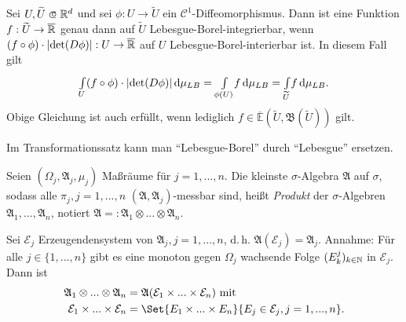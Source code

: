 \documentclass{cheat-sheet}
\newcommand{\Alg}{\mathfrak{A}} %
\newcommand{\Bor}{\mathfrak{B}} %
\newcommand{\E}{\mathbb{E}} %
\theoremstyle{definition}
\begin{document}

\begin{satz}[Transformationssatz]
  Sei $U, \widetilde{U} \opn \R^d$ und sei $\phi : U \to \widetilde{U}$ ein $\mathcal{C}^1$-Diffeomorphismus. Dann ist eine Funktion $f : \widetilde{U} \to \overline{\mathbb{R}}$ genau dann auf $\widetilde{U}$ Lebesgue-Borel-integrierbar, wenn $(f \circ \phi) \cdot \lvert\det(D\phi)\rvert : U \to \overline{\mathbb{R}}$ auf $U$ Lebesgue-Borel-interierbar ist. In diesem Fall gilt
  \[ {\textstyle \int\limits_{U}^{}} (f \circ \phi) \cdot \lvert\det(D\phi)\rvert \,\mathrm{d} \mu_{LB} = {\textstyle \int\limits_{\phi(U)}^{}} f \,\mathrm{d} \mu_{LB} = {\textstyle \int\limits_{\widetilde{U}}^{}} f \,\mathrm{d} \mu_{LB}. \]
  Obige Gleichung ist auch erfüllt, wenn lediglich $f \in \overline{\E}(\widetilde{U}, \Bor(\widetilde{U}))$ gilt.
\end{satz}

\begin{bem}
  Im Transformationssatz kann man "`Lebesgue-Borel"' durch "`Lebesgue"' ersetzen.
\end{bem}


% 

\begin{defn}
  Seien $(\Omega_j, \Alg_j, \mu_j)$ Maßräume für $j = 1, ..., n$. Die kleinste $\sigma$-Algebra $\Alg$ auf $\sigma$, sodass alle $\pi_j, j = 1, ..., n$ $(\Alg, \Alg_j)$-messbar sind, heißt \emph{Produkt} der $\sigma$-Algebren $\Alg_1, ..., \Alg_n$, notiert $\Alg =: \Alg_1 \otimes ... \otimes \Alg_n$.
\end{defn}

\begin{satz}
  Sei $\mathcal{E}_j$ Erzeugendensystem von $\Alg_j, j = 1, ..., n$, d.\,h. $\Alg(\mathcal{E}_j) = \Alg_j$. Annahme: Für alle $j \in \{ 1, ..., n \}$ gibt es eine monoton gegen $\Omega_j$ wachsende Folge $(E^j_k)_{k \in \mathbb{N}}$ in $\mathcal{E}_j$. Dann ist
  \begin{align*}
    \Alg_1 \otimes ... \otimes \Alg_n &= \Alg(\mathcal{E}_1 \times ... \times \mathcal{E}_n) \text{ mit }\\
    \mathcal{E}_1 \times ... \times \mathcal{E}_n &= \Set{ E_1 \times ... \times E_n }{ E_j \in \mathcal{E}_j, j = 1, ..., n }.
  \end{align*}
\end{satz}
\end{document}
